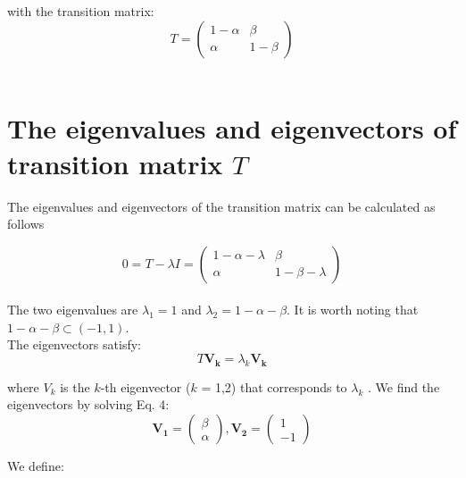 \documentclass{article}
\begin{document}
with the transition matrix: \\

\begin{equation}
    T=\begin{pmatrix}  
    {1-\alpha} & \beta \\  \alpha & {1-\beta}
    \end{pmatrix}
\end{equation} \\

\section{The eigenvalues and eigenvectors of transition matrix $T$}
The eigenvalues and eigenvectors of the transition matrix can be calculated as follows

\begin{equation}
    0=T-{\lambda}I=\begin{pmatrix} 1 - \alpha - \lambda & \beta \\ \alpha & 1 - \beta - \lambda \end{pmatrix}
\end{equation} \\

The two eigenvalues are ${\lambda}_1=1$ and ${\lambda}_2=1-\alpha-\beta$. It is worth noting that 
$1-\alpha-\beta \subset(-1,1)$. \\

The eigenvectors satisfy: \\

\begin{equation}
    T\boldsymbol{V_k}={\lambda}_k\boldsymbol{V_k}
\end{equation}

where $V_k$ is the $k$-th eigenvector ($k$ = 1,2) that corresponds to ${\lambda}_k$ . We find the eigenvectors by
solving Eq. 4: \\

\begin{equation}
    \boldsymbol{V_1}=\begin{pmatrix}
        \beta \\ \alpha
    \end{pmatrix},
    \boldsymbol{V_2}=\begin{pmatrix}
        1 \\ -1
    \end{pmatrix}
\end{equation}

We define: \\
\end{document}
